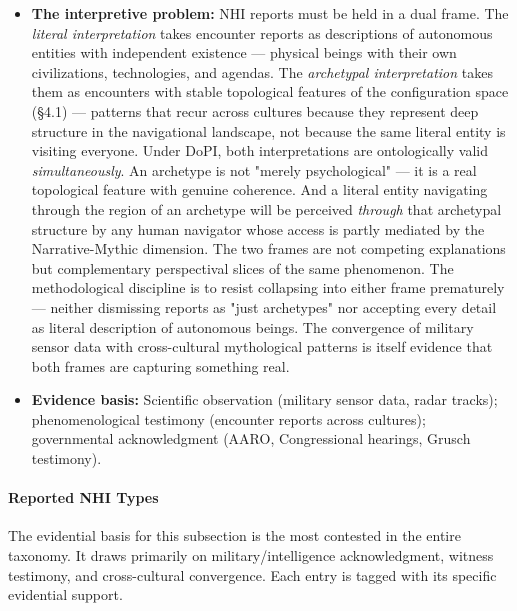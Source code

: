 \begin{itemize}[nosep,leftmargin=*]
  \item \textbf{The interpretive problem:} NHI reports must be held in a dual frame. The \textit{literal interpretation} takes encounter reports as descriptions of autonomous entities with independent existence — physical beings with their own civilizations, technologies, and agendas. The \textit{archetypal interpretation} takes them as encounters with stable topological features of the configuration space (§4.1) — patterns that recur across cultures because they represent deep structure in the navigational landscape, not because the same literal entity is visiting everyone. Under DoPI, both interpretations are ontologically valid \textit{simultaneously}. An archetype is not "merely psychological" — it is a real topological feature with genuine coherence. And a literal entity navigating through the region of an archetype will be perceived \textit{through} that archetypal structure by any human navigator whose access is partly mediated by the Narrative-Mythic dimension. The two frames are not competing explanations but complementary perspectival slices of the same phenomenon. The methodological discipline is to resist collapsing into either frame prematurely — neither dismissing reports as "just archetypes" nor accepting every detail as literal description of autonomous beings. The convergence of military sensor data with cross-cultural mythological patterns is itself evidence that both frames are capturing something real.
  \item \textbf{Evidence basis:} Scientific observation (military sensor data, radar tracks); phenomenological testimony (encounter reports across cultures); governmental acknowledgment (AARO, Congressional hearings, Grusch testimony).
\end{itemize}


\paragraph*{Reported NHI Types}


The evidential basis for this subsection is the most contested in the entire taxonomy. It draws primarily on military/intelligence acknowledgment, witness testimony, and cross-cultural convergence. Each entry is tagged with its specific evidential support.


